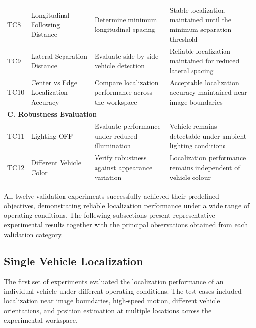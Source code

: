 \begin{table}[!ht]
\begin{tabular}{p{1.1cm} p{4.0cm} p{4.5cm} p{6.0cm}}
		TC8 &
		Longitudinal Following Distance &
		Determine minimum longitudinal spacing &
		Stable localization maintained until the minimum separation threshold \\
		
		TC9 &
		Lateral Separation Distance &
		Evaluate side-by-side vehicle detection &
		Reliable localization maintained for reduced lateral spacing \\
		
		TC10 &
		Center vs Edge Localization Accuracy &
		Compare localization performance across the workspace &
		Acceptable localization accuracy maintained near image boundaries \\
		
		\midrule
		
		\multicolumn{4}{l}{\textbf{C. Robustness Evaluation}}\\
		\midrule
		
		TC11 &
		Lighting OFF &
		Evaluate performance under reduced illumination &
		Vehicle remains detectable under ambient lighting conditions \\
		
		TC12 &
		Different Vehicle Color &
		Verify robustness against appearance variation &
		Localization performance remains independent of vehicle colour \\
		
		\bottomrule
	\end{tabular}
\end{table}

All twelve validation experiments successfully achieved their predefined objectives, demonstrating reliable localization performance under a wide range of operating conditions. The following subsections present representative experimental results together with the principal observations obtained from each validation category.

\subsection{Single Vehicle Localization}

The first set of experiments evaluated the localization performance of an individual vehicle under different operating conditions. The test cases included localization near image boundaries, high-speed motion, different vehicle orientations, and position estimation at multiple locations across the experimental workspace.

